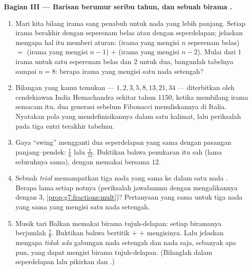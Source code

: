 \begin{problem}
\medskip
\noindent\textbf{Bagian III --- Barisan berumur seribu tahun, dan
sebuah birama .}
\begin{enumerate}[resume]
  \item Mari kita bilang irama sang penabuh untuk nada yang lebih
        panjang. Setiap irama berakhir dengan seperenam belas atau
        dengan seperdelapan; jelaskan mengapa hal itu memberi aturan:
        (irama yang mengisi $n$ seperenam belas) $=$ (irama yang
        mengisi $n - 1$) $+$ (irama yang mengisi $n - 2$). Mulai dari
        $1$ irama untuk satu seperenam belas dan $2$ untuk dua,
        bangunlah tabelnya sampai $n = 8$: berapa irama yang mengisi
        satu nada setengah?
  \item Bilangan yang kamu temukan --- $1, 2, 3, 5, 8, 13, 21, 34$
        --- diterbitkan oleh cendekiawan India Hemachandra sekitar
        tahun 1150, ketika membilang irama semacam itu, dua generasi
        sebelum Fibonacci menuliskannya di Italia. Nyatakan pola yang
        mendefinisikannya dalam satu kalimat, lalu periksalah pada
        tiga entri terakhir tabelmu.
  \item Gaya ``swing'' mengganti dua seperdelapan yang sama dengan
        pasangan panjang--pendek: $\frac16$ lalu $\frac{1}{12}$.
        Buktikan bahwa penukaran itu sah (lama seluruhnya sama),
        dengan memakai  bersama $12$.
  \item Sebuah \emph{triol} memampatkan tiga nada yang sama ke dalam
        satu nada . Berapa lama setiap notnya (periksalah
        jawabanmu dengan mengalikannya dengan $3$,
        \cref{prop:g7:fractions:mult})? Pertanyaan yang sama untuk
        tiga nada yang sama yang mengisi satu nada setengah.
  \item Musik tari Balkan memakai birama tujuh-delapan: setiap
        biramanya berjumlah $\frac78$. Buktikan bahwa 
        bertitik $+$  $+$  mengisinya. Lalu
        jelaskan mengapa \emph{tidak ada} gabungan nada setengah dan
        nada  saja, sebanyak apa pun, yang dapat mengisi
        birama tujuh-delapan. (Bilanglah dalam seperdelapan lalu
        pikirkan  dan .)

\end{enumerate}
\end{problem}
